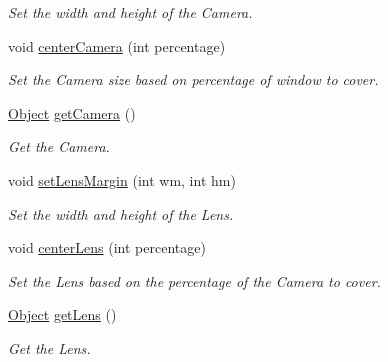\begin{DoxyCompactItemize}
\begin{DoxyCompactList}\small\item\em Set the width and height of the Camera. \end{DoxyCompactList}\item 
void \hyperlink{classTileset_a07c27b0da0fe3da1737d03478f070b6b}{center\+Camera} (int percentage)\hypertarget{classTileset_a07c27b0da0fe3da1737d03478f070b6b}{}\label{classTileset_a07c27b0da0fe3da1737d03478f070b6b}

\begin{DoxyCompactList}\small\item\em Set the Camera size based on percentage of window to cover. \end{DoxyCompactList}\item 
\hyperlink{classObject}{Object} \hyperlink{classTileset_a1ca6be7ebfff987439c52224a48870c3}{get\+Camera} ()\hypertarget{classTileset_a1ca6be7ebfff987439c52224a48870c3}{}\label{classTileset_a1ca6be7ebfff987439c52224a48870c3}

\begin{DoxyCompactList}\small\item\em Get the Camera. \end{DoxyCompactList}\item 
void \hyperlink{classTileset_a6fe1de5d0b2f388521b85549c20b1dfb}{set\+Lens\+Margin} (int wm, int hm)\hypertarget{classTileset_a6fe1de5d0b2f388521b85549c20b1dfb}{}\label{classTileset_a6fe1de5d0b2f388521b85549c20b1dfb}

\begin{DoxyCompactList}\small\item\em Set the width and height of the Lens. \end{DoxyCompactList}\item 
void \hyperlink{classTileset_a0738a218f43e5dd0cfed224ac7db02c5}{center\+Lens} (int percentage)\hypertarget{classTileset_a0738a218f43e5dd0cfed224ac7db02c5}{}\label{classTileset_a0738a218f43e5dd0cfed224ac7db02c5}

\begin{DoxyCompactList}\small\item\em Set the Lens based on the percentage of the Camera to cover. \end{DoxyCompactList}\item 
\hyperlink{classObject}{Object} \hyperlink{classTileset_a1dfdb1ee8aa546ddf4acc23cd68774e1}{get\+Lens} ()\hypertarget{classTileset_a1dfdb1ee8aa546ddf4acc23cd68774e1}{}\label{classTileset_a1dfdb1ee8aa546ddf4acc23cd68774e1}

\begin{DoxyCompactList}\small\item\em Get the Lens. \end{DoxyCompactList}\end{DoxyCompactItemize}
